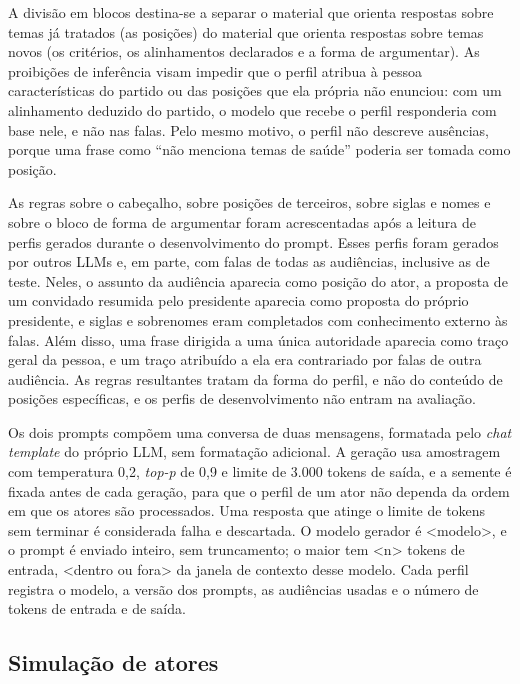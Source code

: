 A divisão em blocos destina-se a separar o material que orienta respostas sobre temas já tratados
(as posições) do material que orienta respostas sobre temas novos (os critérios, os alinhamentos
declarados e a forma de argumentar). As proibições de inferência visam impedir que o perfil atribua à pessoa
características do partido ou das posições que ela própria não enunciou: com um alinhamento deduzido
do partido, o modelo que recebe o perfil responderia com base nele, e não nas falas.
Pelo mesmo motivo, o perfil não descreve ausências, porque uma frase como ``não menciona temas de
saúde'' poderia ser tomada como posição.

As regras sobre o cabeçalho, sobre posições de terceiros, sobre siglas e nomes e sobre o bloco de
forma de argumentar foram acrescentadas após a leitura de perfis gerados durante o desenvolvimento do
prompt. Esses perfis foram gerados por outros LLMs e, em parte, com falas de todas as audiências,
inclusive as de teste. Neles, o assunto da audiência aparecia como posição do ator, a proposta de um
convidado resumida pelo presidente aparecia como proposta do próprio presidente, e siglas e sobrenomes
eram completados com conhecimento externo às falas. Além disso, uma frase dirigida a uma única
autoridade aparecia como traço geral da pessoa, e um traço atribuído a ela era contrariado por falas
de outra audiência. As regras resultantes tratam da forma do perfil, e não do conteúdo de posições
específicas, e os perfis de desenvolvimento não entram na avaliação.

Os dois prompts compõem uma conversa de duas mensagens, formatada pelo \textit{chat template} do
próprio LLM, sem formatação adicional. A geração usa amostragem com temperatura 0,2, \textit{top-p}
de 0,9 e limite de 3.000 tokens de saída, e a semente é fixada antes de cada geração, para que o
perfil de um ator não dependa da ordem em que os atores são processados. Uma resposta que atinge o
limite de tokens sem terminar é considerada falha e descartada. O modelo gerador é <modelo>, e o
prompt é enviado inteiro, sem truncamento; o maior tem <n> tokens de entrada, <dentro ou fora> da
janela de contexto desse modelo. Cada perfil registra o modelo, a versão dos prompts, as audiências
usadas e o número de tokens de entrada e de saída.


\subsection{Simulação de atores}
\label{sec:metodo-simulacao}

